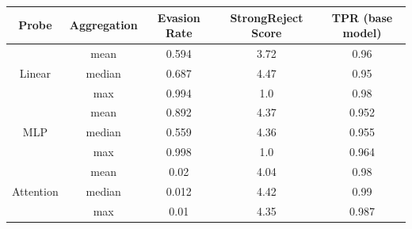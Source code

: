 \begin{tabular}{ccccc}
    Probe & Aggregation & Evasion Rate & StrongReject Score & TPR (base model) \\
    \midrule
     & mean & 0.594 & 3.72 & 0.96 \\
    Linear & median & 0.687 & 4.47 & 0.95 \\
     & max & 0.994 & 1.0 & 0.98 \\
    \midrule
     & mean & 0.892 & 4.37 & 0.952 \\
    MLP & median & 0.559 & 4.36 & 0.955 \\
     & max & 0.998 & 1.0 & 0.964 \\
    \midrule
     & mean & 0.02 & 4.04 & 0.98 \\
    Attention & median & 0.012 & 4.42 & 0.99 \\
     & max & 0.01 & 4.35 & 0.987 \\
\end{tabular}
